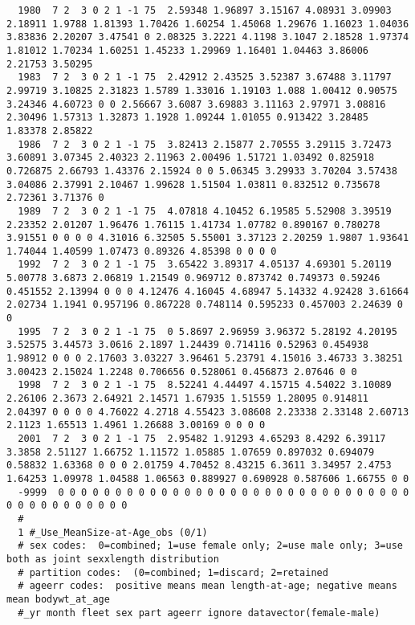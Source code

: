 \begin{landscape}
{\begin{verbatim}
  1980  7 2  3 0 2 1 -1 75  2.59348 1.96897 3.15167 4.08931 3.09903 2.18911 1.9788 1.81393 1.70426 1.60254 1.45068 1.29676 1.16023 1.04036 3.83836 2.20207 3.47541 0 2.08325 3.2221 4.1198 3.1047 2.18528 1.97374 1.81012 1.70234 1.60251 1.45233 1.29969 1.16401 1.04463 3.86006   2.21753 3.50295
  1983  7 2  3 0 2 1 -1 75  2.42912 2.43525 3.52387 3.67488 3.11797 2.99719 3.10825 2.31823 1.5789 1.33016 1.19103 1.088 1.00412 0.90575 3.24346 4.60723 0 0 2.56667 3.6087 3.69883 3.11163 2.97971 3.08816 2.30496 1.57313 1.32873 1.1928 1.09244 1.01055 0.913422 3.28485   1.83378 2.85822
  1986  7 2  3 0 2 1 -1 75  3.82413 2.15877 2.70555 3.29115 3.72473 3.60891 3.07345 2.40323 2.11963 2.00496 1.51721 1.03492 0.825918 0.726875 2.66793 1.43376 2.15924 0 0 5.06345 3.29933 3.70204 3.57438 3.04086 2.37991 2.10467 1.99628 1.51504 1.03811 0.832512 0.735678   2.72361 3.71376 0
  1989  7 2  3 0 2 1 -1 75  4.07818 4.10452 6.19585 5.52908 3.39519 2.23352 2.01207 1.96476 1.76115 1.41734 1.07782 0.890167 0.780278 3.91551 0 0 0 0 4.31016 6.32505 5.55001 3.37123 2.20259 1.9807 1.93641 1.74044 1.40599 1.07473 0.89326 4.85398 0 0 0 0
  1992  7 2  3 0 2 1 -1 75  3.65422 3.89317 4.05137 4.69301 5.20119 5.00778 3.6873 2.06819 1.21549 0.969712 0.873742 0.749373 0.59246 0.451552 2.13994 0 0 0 4.12476 4.16045 4.68947 5.14332 4.92428 3.61664 2.02734 1.1941 0.957196 0.867228 0.748114 0.595233 0.457003 2.24639 0  0
  1995  7 2  3 0 2 1 -1 75  0 5.8697 2.96959 3.96372 5.28192 4.20195 3.52575 3.44573 3.0616 2.1897 1.24439 0.714116 0.52963 0.454938 1.98912 0 0 0 2.17603 3.03227 3.96461 5.23791 4.15016 3.46733 3.38251 3.00423 2.15024 1.2248 0.706656 0.528061 0.456873 2.07646 0 0
  1998  7 2  3 0 2 1 -1 75  8.52241 4.44497 4.15715 4.54022 3.10089 2.26106 2.3673 2.64921 2.14571 1.67935 1.51559 1.28095 0.914811 2.04397 0 0 0 0 4.76022 4.2718 4.55423 3.08608 2.23338 2.33148 2.60713 2.1123 1.65513 1.4961 1.26688 3.00169 0 0 0 0
  2001  7 2  3 0 2 1 -1 75  2.95482 1.91293 4.65293 8.4292 6.39117 3.3858 2.51127 1.66752 1.11572 1.05885 1.07659 0.897032 0.694079 0.58832 1.63368 0 0 0 2.01759 4.70452 8.43215 6.3611 3.34957 2.4753 1.64253 1.09978 1.04588 1.06563 0.889927 0.690928 0.587606 1.66755 0 0
  -9999  0 0 0 0 0 0 0 0 0 0 0 0 0 0 0 0 0 0 0 0 0 0 0 0 0 0 0 0 0 0 0 0 0 0 0 0 0 0 0 0 0 0
  #
  1 #_Use_MeanSize-at-Age_obs (0/1)
  # sex codes:  0=combined; 1=use female only; 2=use male only; 3=use both as joint sexxlength distribution
  # partition codes:  (0=combined; 1=discard; 2=retained
  # ageerr codes:  positive means mean length-at-age; negative means mean bodywt_at_age
  #_yr month fleet sex part ageerr ignore datavector(female-male)

\end{verbatim}}
\end{landscape}
